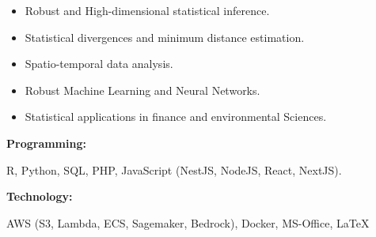 \documentclass[9pt]{developercv} %
\begin{document}

\begin{minipage}[t]{0.56\textwidth}
    \vspace{-12pt}

    \begin{itemize}[noitemsep, leftmargin=*]
        \item Robust and High-dimensional statistical inference.
        \item Statistical divergences and minimum distance estimation.
        \item Spatio-temporal data analysis.
        \item Robust Machine Learning and Neural Networks.
        \item Statistical applications in finance and environmental Sciences.
    \end{itemize}

\end{minipage}
\hfill %
\begin{minipage}[t]{0.42\textwidth}
    \vspace{-6pt}

    \begin{minipage}[t]{0.25\textwidth}
        \textbf{Programming:}
    \end{minipage}
    \hfill
    \begin{minipage}[t]{0.65\textwidth}
       \small R, Python, SQL, PHP, JavaScript (NestJS, NodeJS, React, NextJS).
    \end{minipage}
    \vspace{3mm}

    \begin{minipage}[t]{0.25\textwidth}
        \textbf{Technology: }
    \end{minipage}
    \hfill
    \begin{minipage}[t]{0.65\textwidth}
        \small AWS (S3, Lambda, ECS, Sagemaker, Bedrock), Docker, MS-Office, \LaTeX
    \end{minipage}
    \vspace{3mm}


\end{minipage}
\end{document}
